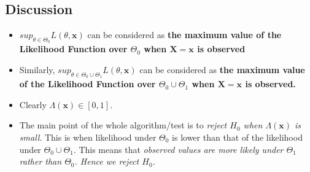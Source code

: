 \documentclass[a4paper]{article}
\begin{document}
\subsection{Discussion}
\begin{itemize}
	\item {$sup_{\theta \in \Theta_0}L\left( \theta,\mathbf{x} \right) $ can be considered as \textbf{the maximum value of the Likelihood Function over $\Theta_0$ when $\mathbf{X} = \mathbf{x}$ is observed}}
	\item{Similarly, $sup_{\theta \in  \Theta_0\cup\Theta_1}L\left( \theta,\mathbf{x} \right) $ can be considered as \textbf{the maximum value of the Likelihood Function over $\Theta_0 \cup \Theta_1$ when $\mathbf{X} = \mathbf{x}$ is observed.}}
	\item{Clearly $\Lambda\left( \mathbf{x} \right) \in \left[ 0,1 \right] $.}
	\item{The main point of the whole algorithm/test is to \textit{reject $H_0$ when $\Lambda\left( \mathbf{x} \right) $ is small}. This is when likelihood under $\Theta_0$ is lower than that of the likelihood under $\Theta_0\cup\Theta_1$. This means that \textit{observed values are more likely under $\Theta_1$ rather than $\Theta_0$. Hence we reject $H_0$. }}
\end{itemize}
\end{document}
